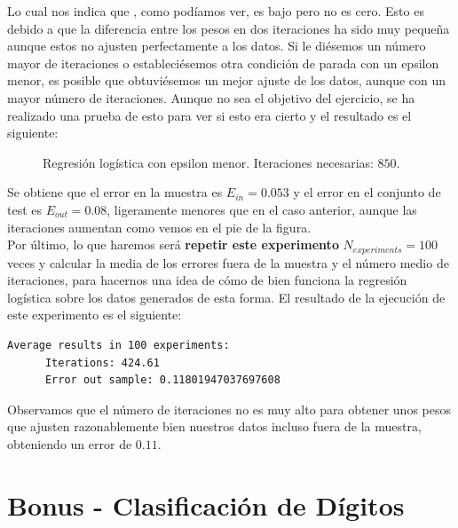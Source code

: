 \documentclass[12pt]{article}
\begin{document}
{Lo cual nos indica que , como podíamos ver, es bajo pero no es cero. Esto es debido a que la diferencia entre los pesos en dos iteraciones ha sido muy pequeña aunque estos no ajusten perfectamente a los datos. Si le diésemos un número mayor de iteraciones o estableciésemos otra condición de parada con un epsilon menor, es posible que obtuviésemos un mejor ajuste de los datos, aunque con un mayor número de iteraciones. Aunque no sea el objetivo del ejercicio, se ha realizado una prueba de esto para ver si esto era cierto y el resultado es el siguiente:

\begin{figure}[H]
  \centering
  \qquad
  \caption{Regresión logística con epsilon menor. Iteraciones necesarias: $850$. }
  \label{fig:myfig:3}
\end{figure}
Se obtiene que el error en la muestra es $E_{in} = 0.053$ y el error en el conjunto de test es $E_{out} = 0.08$, ligeramente menores que en el caso anterior, aunque las iteraciones aumentan como vemos en el pie de la figura.\\

Por último, lo que haremos será \textbf{repetir este experimento} $N_{experiments} = 100$ veces y calcular la media de los errores fuera de la muestra y el número medio de iteraciones, para hacernos una idea de cómo de bien funciona la regresión logística sobre los datos generados de esta forma. El resultado de la ejecución de este experimento es el siguiente:
\begin{lstlisting}[language=bash]
  Average results in 100 experiments:
      Iterations: 424.61
      Error out sample: 0.11801947037697608
\end{lstlisting}

Observamos que el número de iteraciones no es muy alto para obtener unos pesos que ajusten razonablemente bien nuestros datos incluso fuera de la muestra, obteniendo un error de $0.11$.

\section*{Bonus - Clasificación de Dígitos}

}
\end{document}
